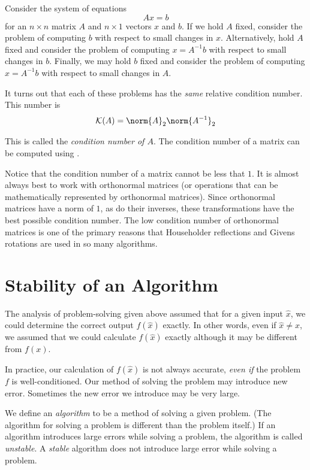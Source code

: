 \begin{example}
Consider the system of equations
\[ Ax = b \] 
for an $n \times n$ matrix $A$ and $n \times 1$ vectors $x$ and $b$. If we hold $A$ fixed, consider the problem of computing $b$ with respect to small changes in $x$. Alternatively, hold $A$ fixed and consider the problem of computing $x = A^{-1} b$ with respect to small changes in $b$. Finally, we may hold $b$ fixed and consider the problem of computing $x = A^{-1}b$ with respect to small changes in $A$.

It turns out that each of these problems has the \emph{same} relative condition number. This number is 
\[
\mathcal{K} (A) = \norm{A}_2 \norm{A^{-1}}_2
\]

This is called the \emph{condition number of $A$}.
The condition number of a matrix can be computed using .

Notice that the condition number of a matrix cannot be less that $1$.
It is almost always best to work with orthonormal matrices (or operations that can be mathematically represented by orthonormal matrices).
Since orthonormal matrices have a norm of $1$, as do their inverses, these transformations have the best possible condition number.
The low condition number of orthonormal matrices is one of the primary reasons that Householder reflections and Givens rotations are used in so many algorithms.
\end{example}

\section*{Stability of an Algorithm}
The analysis of problem-solving given above assumed that for a given input $\hat{x}$, we could determine the correct output $f(\hat{x})$ exactly. In other words, even if $\hat{x} \neq x$, we assumed that we could calculate $f(\hat{x})$ exactly although it may be different from $f(x)$. 

In practice, our calculation of $f(\hat{x})$ is not always accurate, \emph{even if} the problem $f$ is well-conditioned. Our method of solving the problem may introduce new error. Sometimes the new error we introduce may be very large. 

We define an \emph{algorithm} to be a method of solving a given problem. (The algorithm for solving a problem is different than the problem itself.) If an algorithm introduces large errors while solving a problem, the algorithm is called \emph{unstable}. A \emph{stable} algorithm does not introduce large error while solving a problem.

